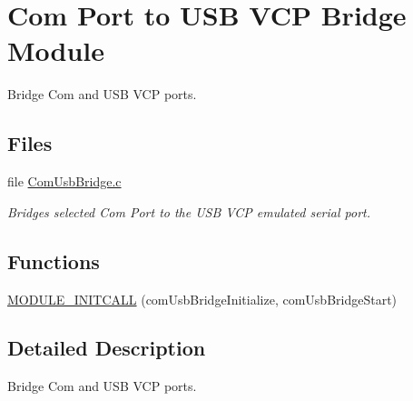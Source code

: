 \hypertarget{group___com_usb_bridge_module}{\section{Com Port to U\-S\-B V\-C\-P Bridge Module}
\label{group___com_usb_bridge_module}
}


Bridge Com and U\-S\-B V\-C\-P ports.  


\subsection*{Files}
\begin{DoxyCompactItemize}
\item 
file \hyperlink{_com_usb_bridge_8c}{Com\-Usb\-Bridge.\-c}
\begin{DoxyCompactList}\small\item\em Bridges selected Com Port to the U\-S\-B V\-C\-P emulated serial port. \end{DoxyCompactList}\end{DoxyCompactItemize}
\subsection*{Functions}
\begin{DoxyCompactItemize}
\item 
\hyperlink{group___com_usb_bridge_module_ga9361d170152b4532b7d0273d3daaa6a8}{M\-O\-D\-U\-L\-E\-\_\-\-I\-N\-I\-T\-C\-A\-L\-L} (com\-Usb\-Bridge\-Initialize, com\-Usb\-Bridge\-Start)
\end{DoxyCompactItemize}


\subsection{Detailed Description}
Bridge Com and U\-S\-B V\-C\-P ports. 

